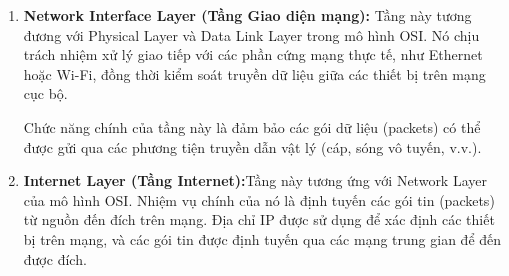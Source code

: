 \documentclass[a4paper,12pt]{article}
\begin{document}
\begin{enumerate}
    \item \textbf{Network Interface Layer (Tầng Giao diện mạng):} Tầng này tương đương với Physical Layer và Data Link Layer trong mô hình OSI. Nó chịu trách nhiệm xử lý giao tiếp với các phần cứng mạng thực tế, như Ethernet hoặc Wi-Fi, đồng thời kiểm soát truyền dữ liệu giữa các thiết bị trên mạng cục bộ.

Chức năng chính của tầng này là đảm bảo các gói dữ liệu (packets) có thể được gửi qua các phương tiện truyền dẫn vật lý (cáp, sóng vô tuyến, v.v.).
    \item \textbf{Internet Layer (Tầng Internet):}Tầng này tương ứng với Network Layer của mô hình OSI. Nhiệm vụ chính của nó là định tuyến các gói tin (packets) từ nguồn đến đích trên mạng. Địa chỉ IP được sử dụng để xác định các thiết bị trên mạng, và các gói tin được định tuyến qua các mạng trung gian để đến được đích.


\end{enumerate}
\end{document}
